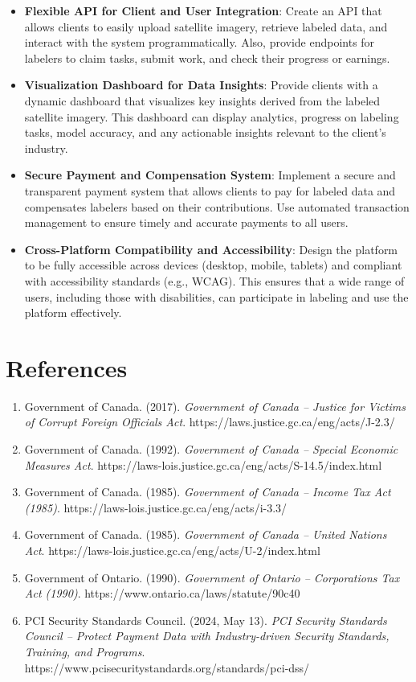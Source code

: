 \documentclass[12pt]{article}
\begin{document}
\begin{itemize}
    \item \textbf{Flexible API for Client and User Integration}: Create an API that allows clients to easily upload satellite imagery, retrieve labeled data, and interact with the system programmatically. Also, provide endpoints for labelers to claim tasks, submit work, and check their progress or earnings.
    
    \item \textbf{Visualization Dashboard for Data Insights}: Provide clients with a dynamic dashboard that visualizes key insights derived from the labeled satellite imagery. This dashboard can display analytics, progress on labeling tasks, model accuracy, and any actionable insights relevant to the client’s industry.
    
    \item \textbf{Secure Payment and Compensation System}: Implement a secure and transparent payment system that allows clients to pay for labeled data and compensates labelers based on their contributions. Use automated transaction management to ensure timely and accurate payments to all users.
    
    \item \textbf{Cross-Platform Compatibility and Accessibility}: Design the platform to be fully accessible across devices (desktop, mobile, tablets) and compliant with accessibility standards (e.g., WCAG). This ensures that a wide range of users, including those with disabilities, can participate in labeling and use the platform effectively.
\end{itemize}

\newpage{}
\section*{References}
\begin{enumerate}
    \item Government of Canada. (2017). \textit{Government of Canada – Justice for Victims of Corrupt Foreign Officials Act}. https://laws.justice.gc.ca/eng/acts/J-2.3/
    \item Government of Canada. (1992). \textit{Government of Canada – Special Economic Measures Act}. https://laws-lois.justice.gc.ca/eng/acts/S-14.5/index.html
    \item Government of Canada. (1985). \textit{Government of Canada – Income Tax Act (1985)}. https://laws-lois.justice.gc.ca/eng/acts/i-3.3/
    \item Government of Canada. (1985). \textit{Government of Canada – United Nations Act}. https://laws-lois.justice.gc.ca/eng/acts/U-2/index.html
    \item Government of Ontario. (1990). \textit{Government of Ontario – Corporations Tax Act (1990)}. https://www.ontario.ca/laws/statute/90c40
    \item PCI Security Standards Council. (2024, May 13). \textit{PCI Security Standards Council – Protect Payment Data with Industry-driven Security Standards, Training, and Programs}. https://www.pcisecuritystandards.org/standards/pci-dss/
\end{enumerate}
\end{document}
